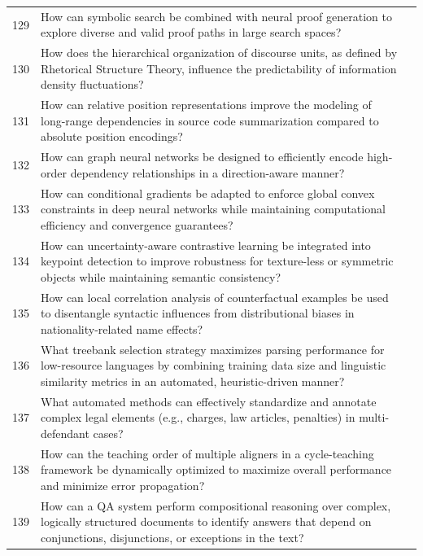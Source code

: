 \begin{longtable}{p{0.8cm}p{9cm}p{2.5cm}}
129 & How can symbolic search be combined with neural proof generation to explore diverse and valid proof paths in large search spaces? & \cite{10.18653/v1/2022.emnlp-main.7} \\
130 & How does the hierarchical organization of discourse units, as defined by Rhetorical Structure Theory, influence the predictability of information density fluctuations? & \cite{10.18653/v1/2024.emnlp-main.1047} \\
131 & How can relative position representations improve the modeling of long-range dependencies in source code summarization compared to absolute position encodings? & \cite{10.18653/v1/2020.acl-main.449} \\
132 & How can graph neural networks be designed to efficiently encode high-order dependency relationships in a direction-aware manner? & \cite{10.18653/v1/n19-1237} \\
133 & How can conditional gradients be adapted to enforce global convex constraints in deep neural networks while maintaining computational efficiency and convergence guarantees? & \cite{10.1609/aaai.v33i01.33014772} \\
134 & How can uncertainty-aware contrastive learning be integrated into keypoint detection to improve robustness for texture-less or symmetric objects while maintaining semantic consistency? & \cite{10.1609/aaai.v36i5.20482} \\
135 & How can local correlation analysis of counterfactual examples be used to disentangle syntactic influences from distributional biases in nationality-related name effects? & \cite{10.18653/v1/2024.emnlp-main.34} \\
136 & What treebank selection strategy maximizes parsing performance for low-resource languages by combining training data size and linguistic similarity metrics in an automated, heuristic-driven manner? & \cite{10.18653/v1/2021.findings-acl.431} \\
137 & What automated methods can effectively standardize and annotate complex legal elements (e.g., charges, law articles, penalties) in multi-defendant cases? & \cite{10.18653/v1/2024.findings-acl.351} \\
138 & How can the teaching order of multiple aligners in a cycle-teaching framework be dynamically optimized to maximize overall performance and minimize error propagation? & \cite{10.1609/aaai.v36i4.20348} \\
139 & How can a QA system perform compositional reasoning over complex, logically structured documents to identify answers that depend on conjunctions, disjunctions, or exceptions in the text? & \cite{10.18653/v1/2022.acl-long.253} \\

\end{longtable}
